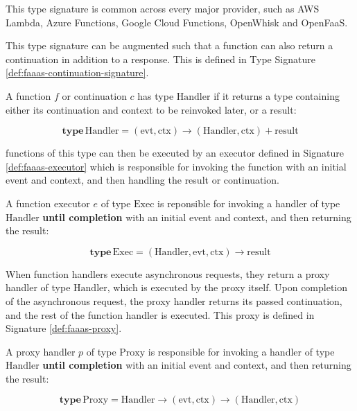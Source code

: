 This type signature is common across every major \faas{} provider, such as AWS Lambda\cite{amazonAWSLambda2024}, Azure Functions\cite{azureAzureFunctions2024}, Google Cloud Functions\cite{googleGoogleCloudFunctions2024}, OpenWhisk\cite{apacheOpenWhisk2024} and OpenFaaS\cite{ellisOpenFaaS2024}.

This type signature can be augmented such that a function can also return a continuation in addition to a response. This is defined in Type Signature \ref{def:faaas-continuation-signature}.

\begin{signature}
\label{def:faaas-continuation-signature}
A function $f$ or continuation $c$ has type $\textrm{Handler}$ if it returns a type containing either its continuation and context to be reinvoked later, or a result:

$$\textbf{type}\, \textrm{Handler} = (\textrm{evt}, \textrm{ctx}) \rightarrow (\textrm{Handler}, \textrm{ctx}) + \textrm{result}$$
\end{signature}

\faas{} functions of this type can then be executed by an executor defined in Signature \ref{def:faaas-executor} which is responsible for invoking the function with an initial event and context, and then handling the result or continuation.

\begin{signature}
\label{def:faaas-executor}
A function executor $e$ of type $\textrm{Exec}$ is reponsible for invoking a \faaas{} handler of type $\textrm{Handler}$ \textbf{until completion} with an initial event and context, and then returning the result:

$$\textbf{type}\, \textrm{Exec} = (\textrm{Handler}, \textrm{evt}, \textrm{ctx}) \rightarrow \textrm{result}$$
\end{signature}

When function handlers execute asynchronous requests, they return a proxy handler of type $\textrm{Handler}$, which is executed by the proxy itself. Upon completion of the asynchronous request, the proxy handler returns its passed continuation, and the rest of the function handler is executed. This proxy is defined in Signature \ref{def:faaas-proxy}.

\begin{signature}
\label{def:faaas-proxy}
A proxy handler $p$ of type $\textrm{Proxy}$ is responsible for invoking a \faas{} handler of type $\textrm{Handler}$ \textbf{until completion} with an initial event and context, and then returning the result:

$$\textbf{type}\, \textrm{Proxy} = \textrm{Handler} \rightarrow (\textrm{evt}, \textrm{ctx}) \rightarrow (\textrm{Handler}, \textrm{ctx})$$
\end{signature}

